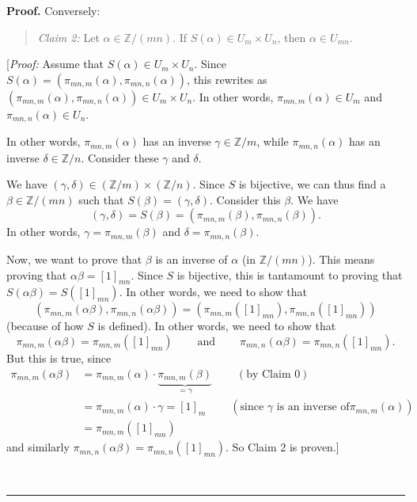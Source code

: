 \documentclass[numbers=enddot,12pt,final,onecolumn,notitlepage]{scrartcl}%
\numberwithin{exer}{subsection}
\theoremstyle{definition}
\newenvironment{statement}{\begin{quote}}{\end{quote}}
\newenvironment{proof}[1][Proof]{\noindent\textbf{#1.} }{\ \rule{0.5em}{0.5em}}
\begin{document}
\begin{proof}
Conversely:

\begin{statement}
\textit{Claim 2:} Let $\alpha\in\mathbb{Z}/\left(  mn\right)  $. If $S\left(
\alpha\right)  \in U_{m}\times U_{n}$, then $\alpha\in U_{mn}$.
\end{statement}

[\textit{Proof:} Assume that $S\left(  \alpha\right)  \in U_{m}\times U_{n}$.
Since $S\left(  \alpha\right)  =\left(  \pi_{mn,m}\left(  \alpha\right)
,\pi_{mn,n}\left(  \alpha\right)  \right)  $, this rewrites as $\left(
\pi_{mn,m}\left(  \alpha\right)  ,\pi_{mn,n}\left(  \alpha\right)  \right)
\in U_{m}\times U_{n}$. In other words, $\pi_{mn,m}\left(  \alpha\right)  \in
U_{m}$ and $\pi_{mn,n}\left(  \alpha\right)  \in U_{n}$.

In other words, $\pi_{mn,m}\left(  \alpha\right)  $ has an inverse $\gamma
\in\mathbb{Z}/m$, while $\pi_{mn,n}\left(  \alpha\right)  $ has an inverse
$\delta\in\mathbb{Z}/n$. Consider these $\gamma$ and $\delta$.

We have $\left(  \gamma,\delta\right)  \in\left(  \mathbb{Z}/m\right)
\times\left(  \mathbb{Z}/n\right)  $. Since $S$ is bijective, we can thus find
a $\beta\in\mathbb{Z}/\left(  mn\right)  $ such that $S\left(  \beta\right)
=\left(  \gamma,\delta\right)  $. Consider this $\beta$. We have%
\[
\left(  \gamma,\delta\right)  =S\left(  \beta\right)  =\left(  \pi
_{mn,m}\left(  \beta\right)  ,\pi_{mn,n}\left(  \beta\right)  \right)  .
\]
In other words, $\gamma=\pi_{mn,m}\left(  \beta\right)  $ and $\delta
=\pi_{mn,n}\left(  \beta\right)  $.

Now, we want to prove that $\beta$ is an inverse of $\alpha$ (in
$\mathbb{Z}/\left(  mn\right)  $). This means proving that $\alpha
\beta=\left[  1\right]  _{mn}$. Since $S$ is bijective, this is tantamount to
proving that $S\left(  \alpha\beta\right)  =S\left(  \left[  1\right]
_{mn}\right)  $. In other words, we need to show that%
\[
\left(  \pi_{mn,m}\left(  \alpha\beta\right)  ,\pi_{mn,n}\left(  \alpha
\beta\right)  \right)  =\left(  \pi_{mn,m}\left(  \left[  1\right]
_{mn}\right)  ,\pi_{mn,n}\left(  \left[  1\right]  _{mn}\right)  \right)
\]
(because of how $S$ is defined). In other words, we need to show that
\[
\pi_{mn,m}\left(  \alpha\beta\right)  =\pi_{mn,m}\left(  \left[  1\right]
_{mn}\right)  \ \ \ \ \ \ \ \ \ \ \text{and}\ \ \ \ \ \ \ \ \ \ \pi
_{mn,n}\left(  \alpha\beta\right)  =\pi_{mn,n}\left(  \left[  1\right]
_{mn}\right)  .
\]
But this is true, since
\begin{align*}
\pi_{mn,m}\left(  \alpha\beta\right)   &  =\pi_{mn,m}\left(  \alpha\right)
\cdot\underbrace{\pi_{mn,m}\left(  \beta\right)  }_{=\gamma}%
\ \ \ \ \ \ \ \ \ \ \left(  \text{by Claim 0}\right) \\
&  =\pi_{mn,m}\left(  \alpha\right)  \cdot\gamma=\left[  1\right]
_{m}\ \ \ \ \ \ \ \ \ \ \left(  \text{since }\gamma\text{ is an inverse of
}\pi_{mn,m}\left(  \alpha\right)  \right) \\
&  =\pi_{mn,m}\left(  \left[  1\right]  _{mn}\right)
\end{align*}
and similarly $\pi_{mn,n}\left(  \alpha\beta\right)  =\pi_{mn,n}\left(
\left[  1\right]  _{mn}\right)  $. So Claim 2 is proven.]


\end{proof}
\end{document}
